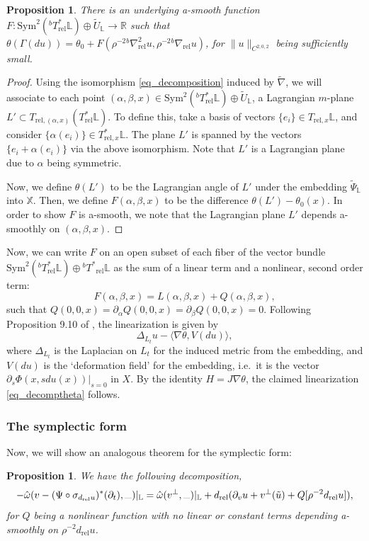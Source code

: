 \documentclass[10pt, a4paper]{article}
\theoremstyle{plain}%
\newtheorem{prop}[theorem]{Proposition}
\theoremstyle{definition}
\numberwithin{figure}{section}
\numberwithin{equation}{section}
\newcommand{\bL}{\mathbb{L}}
\newcommand{\bX}{\mathbb{X}}
\newcommand{\la}{\langle}
\newcommand{\ra}{\rangle}
\newcommand{\bR}{\mathbb{R}}
\newcommand{\pa}{\partial}
\newcommand{\rt}{\rightarrow}
\newcommand{\dr}{d_\mathrm{rel}}
\newcommand{\tu}{\tilde{u}}
\newcommand{\tpsil}{\tilde{\Psi}_\bL}
\newcommand{\tul}{\tilde{U}_\bL}
\newcommand{\rel}{\mathrm{rel}}
\begin{document}
\begin{prop}
	There is an underlying a-smooth function $F : \mathrm{Sym}^2(^bT^*_\mathrm{rel}\bL)\oplus \tul\rt \bR$ such that $\theta(\Gamma(du)) = \theta_0+ F(\rho^{-2}{^b\nabla^2_\mathrm{rel}u}, \rho^{-2}{^b\nabla}_\mathrm{rel}u)$, for $\|u\|_{C^{2,0,2}}$ being sufficiently small.
\end{prop}
\begin{proof}
	Using the isomorphism \eqref{eq_decomposition} induced by $\widetilde{\nabla}$, we will associate to each point $(\alpha,\beta,x)\in \mathrm{Sym}^2(^bT^*_\mathrm{rel}\bL)\oplus \tul$, a Lagrangian $m$-plane $L'\subset T_{\mathrm{rel},(\alpha,x)}(T^*_\mathrm{rel}\bL)$. To define this, take a basis of vectors $\{e_i\}\in T_{\mathrm{rel},x}\bL$, and consider $\{\alpha(e_i)\}\in T^*_{\mathrm{rel},x}\bL$. The plane $L'$ is spanned by the vectors $\{e_i+\alpha(e_i)\}$ via the above isomorphism. Note that $L'$ is a Lagrangian plane due to $\alpha$ being symmetric.
	
	Now, we define $\theta(L')$ to be the Lagrangian angle of $L'$ under the embedding $\tpsil$ into $\bX$. Then, we define $F(\alpha,\beta,x)$ to be the difference $\theta(L')- \theta_0(x)$. In order to show $F$ is a-smooth, we note that the Lagrangian plane $L'$ depends a-smoothly on $(\alpha,\beta,x) $.
\end{proof}

Now, we can write $F$ on an open subset of each fiber of the vector bundle $\mathrm{Sym}^2(^bT^*_\mathrm{rel}\bL)\oplus {^bT^*}_\mathrm{rel}\bL$ as the sum of a linear term and a nonlinear, second order term:
\[
F(\alpha,\beta,x)= L(\alpha,\beta,x)+Q(\alpha,\beta,x),
\]
such that $Q(0,0,x)=\pa_\alpha Q(0,0,x)=\pa_\beta Q(0,0,x)=0$. Following Proposition 9.10 of \cite{Beh11}, the linearization is given by \[
\Delta_{L_t} u - \la \nabla \theta, V(du)\ra,
\]
where $\Delta_{L_t}$ is the Laplacian on $L_t$ for the induced metric from the embedding, and $V(du)$ is the `deformation field' for the embedding, i.e.\ it is the vector $\pa_s\Phi(x,sdu(x))|_{s=0}$ in $X$. By the identity $H=J\nabla\theta$, the claimed linearization \eqref{eq_decomptheta} follows.


\subsubsection{The symplectic form}
 Now, we will show an analogous theorem for the symplectic form:


\begin{prop}
	We have the following decomposition,\[
	-\hat{\omega}(v- {(\Psi\circ \sigma_{\dr u})^*(\partial_t)}, \rule{0.25cm}{0.05mm} )|_{\bL} = \hat{\omega}(v^\perp,\rule{0.25cm}{0.05mm})|_{\bL} + d_\rel(\pa_vu +v^\perp(\tu) +Q[\rho^{-2}d_\rel u]),
	\]
	for $Q$ being a nonlinear function with no linear or constant terms depending a-smoothly on $\rho^{-2}d_\rel u$.
\end{prop} 
\end{document}
